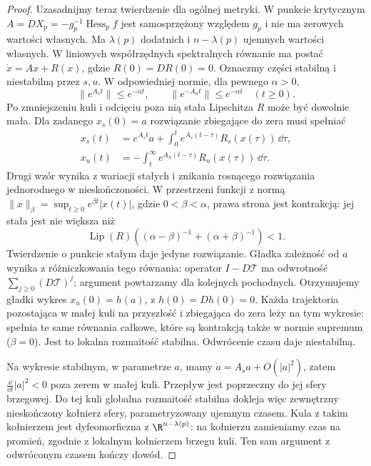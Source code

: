 \begin{proof}
Uzasadnijmy teraz twierdzenie dla ogólnej metryki.
W punkcie krytycznym
$A=DX_p=-g_p^{-1}\operatorname{Hess}_p f$ jest
samosprzężony względem $g_p$ i nie ma zerowych
wartości własnych. Ma $\lambda(p)$ dodatnich
i $n-\lambda(p)$ ujemnych wartości własnych.
W liniowych współrzędnych spektralnych równanie ma postać
$\dot x=Ax+R(x)$, gdzie $R(0)=DR(0)=0$.
Oznaczmy części stabilną i niestabilną przez $s,u$.
W odpowiedniej normie, dla pewnego $\alpha>0$,
\[
 \|e^{A_st}\|\leq e^{-\alpha t},\qquad
 \|e^{-A_ut}\|\leq e^{-\alpha t}\quad(t\geq0).
\]
Po zmniejszeniu kuli i odcięciu poza nią
stała Lipschitza $R$ może być dowolnie mała.
Dla zadanego $x_s(0)=a$ rozwiązanie zbiegające
do zera musi spełniać
\begin{align*}
 x_s(t)&=e^{A_st}a+
       \int_0^t e^{A_s(t-\tau)}R_s(x(\tau))\,\dd\tau,\\
 x_u(t)&=-\int_t^\infty
       e^{A_u(t-\tau)}R_u(x(\tau))\,\dd\tau.
\end{align*}
Drugi wzór wynika z wariacji stałych i znikania
rosnącego rozwiązania jednorodnego w nieskończoności.
W przestrzeni funkcji z normą
$\|x\|_\beta=\sup_{t\geq0}e^{\beta t}|x(t)|$,
gdzie $0<\beta<\alpha$, prawa strona jest kontrakcją:
jej stała jest nie większa niż
\[
 \operatorname{Lip}(R)
 \left((\alpha-\beta)^{-1}+(\alpha+\beta)^{-1}\right)<1.
\]
Twierdzenie o punkcie stałym daje jedyne rozwiązanie.
Gładka zależność od $a$ wynika z różniczkowania
tego równania: operator $I-D\mathcal T$ ma odwrotność
$\sum_{j\geq0}(D\mathcal T)^j$; argument powtarzamy
dla kolejnych pochodnych. Otrzymujemy gładki wykres
$x_u(0)=h(a)$, z $h(0)=Dh(0)=0$.
Każda trajektoria pozostająca w małej kuli na przyszłość
i zbiegająca do zera leży na tym wykresie:
spełnia te same równania całkowe, które są kontrakcją
także w normie supremum ($\beta=0$).
Jest to lokalna rozmaitość stabilna.
Odwrócenie czasu daje niestabilną.

Na wykresie stabilnym, w parametrze $a$, mamy
$\dot a=A_sa+O(|a|^2)$, zatem
$\frac{\dd}{\dd t}|a|^2<0$ poza zerem w małej kuli.
Przepływ jest poprzeczny do jej sfery brzegowej.
Do tej kuli globalna rozmaitość stabilna dokleja
więc zewnętrzny nieskończony kołnierz sfery,
parametryzowany ujemnym czasem. Kula z takim
kołnierzem jest dyfeomorficzna z $\R^{n-\lambda(p)}$:
na kołnierzu zamieniamy czas na promień,
zgodnie z lokalnym kołnierzem brzegu kuli.
Ten sam argument z odwróconym czasem kończy dowód.
\end{proof}

